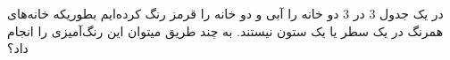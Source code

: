 در یک جدول 3 در 3 دو خانه را آبی و دو خانه را قرمز رنگ کرده‌ایم بطوریکه خانه‌های همرنگ در یک سطر یا یک ستون نیستند.
به چند طریق میتوان این رنگ‌آمیزی را انجام داد؟